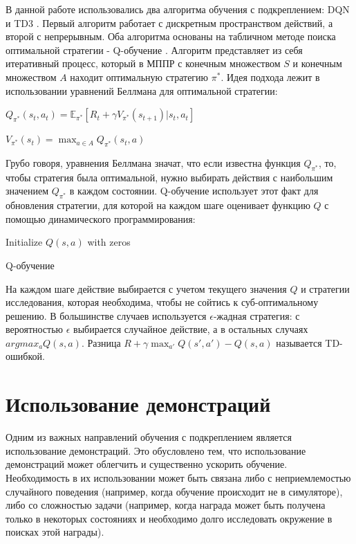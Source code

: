 \documentclass{mipt-thesis-bs}
\begin{document}
В данной работе использовались два алгоритма обучения с подкреплением: DQN \cite{dqn} и TD3 \cite{td3}. Первый алгоритм работает с дискретным пространством действий, а второй с непрерывным. Оба алгоритма основаны на табличном методе поиска оптимальной стратегии - Q-обучение \cite{Q-learning}. Алгоритм представляет из себя итеративный процесс, который в МППР с конечным множеством $S$ и конечным множеством $A$ находит оптимальную стратегию $\pi^*$. Идея подхода лежит в использовании уравнений Беллмана для оптимальной стратегии:
\begin{center}
$Q_{\pi^*}(s_t, a_t) = \mathbb{E}_{\pi^*}[R_{t} + \gamma V_{\pi^*}(s_{t+1})| s_t, a_t]$

$V_{\pi^*}(s_t) = \max_{a\in A}Q_{\pi^*}(s_t, a)$
\end{center}

Грубо говоря, уравнения Беллмана значат, что если известна функция $Q_{\pi^*}$, то, чтобы стратегия была оптимальной, нужно выбирать действия с наибольшим значением $Q_{\pi^*}$ в каждом состоянии. Q-обучение использует этот факт для обновления стратегии, для которой на каждом шаге оценивает функцию $Q$ с помощью динамического программирования: 

\begin{algorithm}[H]
\SetAlgoLined
Initialize $Q(s, a)$ with zeros\;
\caption{Q-обучение}
\end{algorithm}

На каждом шаге действие выбирается с учетом текущего значения $Q$ и стратегии исследования, которая необходима, чтобы не сойтись к суб-оптимальному решению. В большинстве случаев используется $\epsilon$-жадная стратегия: с вероятностью $\epsilon$ выбирается случайное действие, а в остальных случаях $argmax_aQ(s,a)$. Разница $R+\gamma \max _{a'} Q(s', a')-Q(s, a)$ называется TD-ошибкой.

\section{Использование демонстраций}

Одним из важных направлений обучения с подкреплением является использование демонстраций. Это обусловлено тем, что использование демонстраций может облегчить и существенно ускорить обучение. Необходимость в их использовании может быть связана либо с неприемлемостью случайного поведения (например, когда обучение происходит не в симуляторе), либо со сложностью задачи (например, когда награда может быть получена только в некоторых состояниях и необходимо долго исследовать окружение в поисках этой награды).
\end{document}
